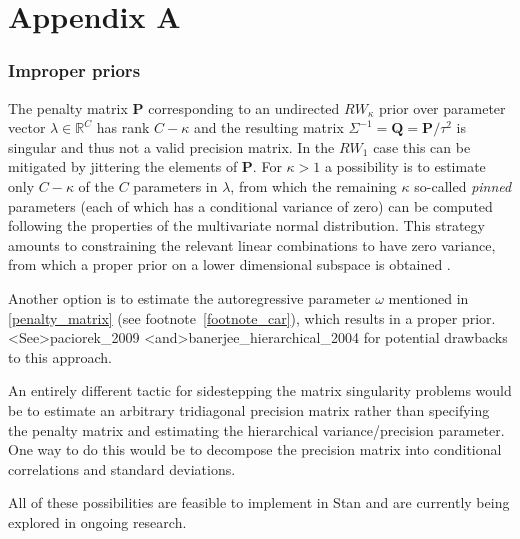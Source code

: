 \chapter*{Appendix A}\label{AppendixA}
\vspace{-1.75cm}
\subsection{Improper priors}

The penalty matrix $\mathbf{P}$ corresponding to an undirected $RW_\kappa$ prior over 
parameter vector $\lambda \in \mathbb{R}^C$ has rank $C - \kappa$ and the resulting 
matrix $\Sigma^{-1} = \mathbf{Q} = \mathbf{P}/\tau^2$ is singular and thus not a valid precision 
matrix. In the $RW_1$ case this can be mitigated by jittering the elements of $\mathbf{P}$. 
For $\kappa > 1$ a possibility is to estimate only $C - \kappa$ of the $C$ parameters in $\lambda$,  
from which the remaining $\kappa$ so-called {\it pinned} parameters (each of which has a 
conditional variance of zero) can be computed following the properties of the multivariate 
normal distribution. This strategy amounts to  constraining the relevant linear combinations 
to have zero variance, from which a proper prior on a lower dimensional subspace is 
obtained . 

Another option is to estimate the autoregressive parameter $\omega$ mentioned 
in \ref{penalty_matrix} (see footnote~\ref{footnote_car}), which results in a proper prior.
\citeA<See>{paciorek_2009} \citeA<and>{banerjee_hierarchical_2004} for potential
drawbacks to this approach.

An entirely different tactic for sidestepping the matrix singularity problems would be 
to estimate an arbitrary tridiagonal precision matrix rather than specifying the penalty 
matrix and estimating the hierarchical variance/precision parameter. One way to do this 
would be to decompose the precision matrix into conditional correlations and 
standard deviations. 

All of these possibilities are feasible to implement in Stan and are currently 
being explored in ongoing research.  




